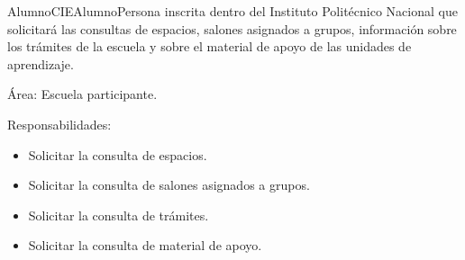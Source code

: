     \begin{actor}{Alumno}{CIEAlumno}{Persona inscrita dentro del Instituto Politécnico Nacional que solicitará las consultas de espacios, salones asignados a grupos, información sobre los trámites de la escuela y sobre el material de apoyo de las unidades de aprendizaje.}

	\item[Área:] Escuela participante.

	\item[Responsabilidades:] \hspace{1pt}
	
		\begin{itemize}

		    \item Solicitar la consulta de espacios.
		    \item Solicitar la consulta de salones asignados a grupos.
		    \item Solicitar la consulta de trámites.
		    \item Solicitar la consulta de material de apoyo.



\end{itemize}
\end{actor}

